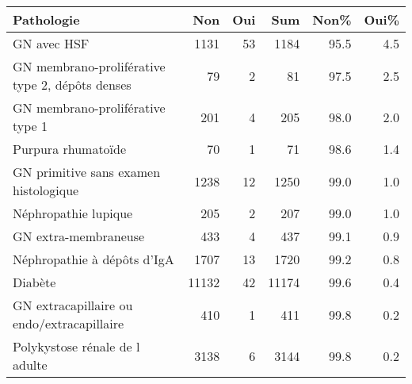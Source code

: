 \documentclass[11pt,a4paper]{article}\usepackage[]{graphicx}\usepackage[]{color}
\begin{document}
\begin{table}[H]
\centering
\begin{tabular}{lrrrrr}
  \hline
Pathologie & Non & Oui & Sum & Non\% & Oui\% \\ 
  \hline
GN avec HSF & 1131 & 53 & 1184 & 95.5 & 4.5 \\ 
  GN membrano-proliférative type 2, dépôts denses & 79 &  2 & 81 & 97.5 & 2.5 \\ 
  GN membrano-proliférative type 1 & 201 &  4 & 205 & 98.0 & 2.0 \\ 
  Purpura rhumatoïde & 70 &  1 & 71 & 98.6 & 1.4 \\ 
  GN primitive sans examen histologique & 1238 & 12 & 1250 & 99.0 & 1.0 \\ 
  Néphropathie lupique & 205 &  2 & 207 & 99.0 & 1.0 \\ 
  GN extra-membraneuse & 433 &  4 & 437 & 99.1 & 0.9 \\ 
  Néphropathie à dépôts d'IgA & 1707 & 13 & 1720 & 99.2 & 0.8 \\ 
  Diabète & 11132 & 42 & 11174 & 99.6 & 0.4 \\ 
  GN extracapillaire ou endo/extracapillaire & 410 &  1 & 411 & 99.8 & 0.2 \\ 
  Polykystose rénale de l adulte & 3138 &  6 & 3144 & 99.8 & 0.2 \\ 
   \hline
\end{tabular}
\end{table}
\end{document}
